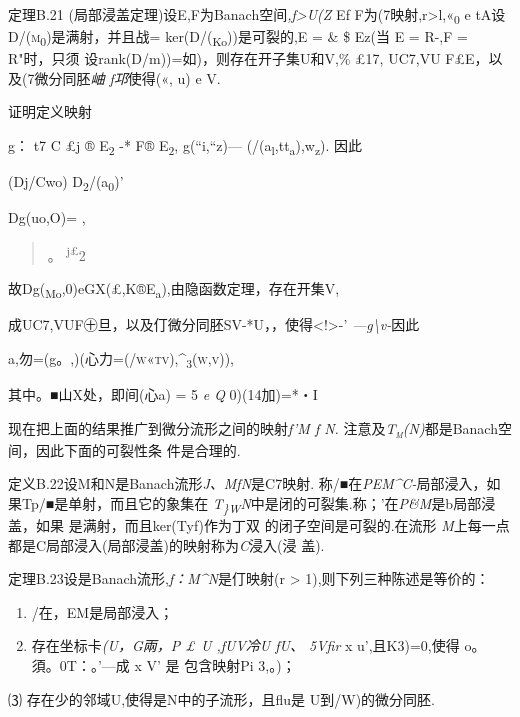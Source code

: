 \documentclass{article}
\begin{document}
定理B.21 (局部浸盖定理)设E,F为Banach空间\emph{,f\textgreater{}U(Z} Ef
F为(7映射,r\textgreater{}l,«\textsubscript{0} e
tA设\textsc{D/(m\textsubscript{0})}是满射，并且战=
ker(D/(\textsubscript{Ko}))是可裂的,E = \& \$ Ez(当 E = R-,F =
R"时，只须 设rank(D/m))=如)，则存在开子集U和V,\% £17, UC7,VU
F£E，以及(7微分同胚\emph{岫 f邛}使得(«, u) e V.

证明定义映射

g： t7 C £j ® E\textsubscript{2} -* F® E\textsubscript{2}, g(``i,``z)---
(/(a\textsubscript{l},tt\textsubscript{a}),w\textsubscript{z}). 因此

(Dj/Cwo) D\textsubscript{2}/(a\textsubscript{0})'

Dg(uo,O)= ,

\begin{quote}
。 \textsuperscript{j£}2
\end{quote}

故Dg(\textsubscript{Mo},0)eGX(£,K®E\textsubscript{a}),由隐函数定理，存在开集V,

成UC7,VUF㊉旦，以及仃微分同胚SV-*U，，使得\textless{}!\textgreater{}-'
\emph{---g\textbackslash{}v-}因此

a,勿=(g。,)(心力=\textsc{(/w«tv),\^{}\textsubscript{3}(w,v)),}

其中。■山X处，即间(心a) = 5 \emph{e Q} 0)(14加)=*・I

现在把上面的结果推广到微分流形之间的映射\emph{f'M f N.}
注意及\emph{\textsc{T\textsubscript{m}(N)}}都是Banach空间，因此下面的可裂性条
件是合理的.

定义B.22设M和N是Banach流形\emph{J、MfN}是C7映射.
称/■在\emph{PEM\^{}C-}局部浸入，如果Tp/■是单射，而且它的象集在
\emph{T\textsubscript{\}W}N}中是闭的可裂集.称；'在\emph{P\&M}是b局部浸盖，如果
是满射，而且ker(Tyf)作为丁双 的闭子空间是可裂的.在流形
\emph{M}上每一点都是C局部浸入(局部浸盖)的映射称为\emph{C}浸入(浸 盖).

定理B.23设是Banach流形,\emph{f：M\^{}N}是仃映射(r \textgreater{}
1),则下列三种陈述是等价的：

\begin{enumerate}
\def\labelenumi{(\arabic{enumi})}
\item
  /在，EM是局部浸入；
\item
  存在坐标卡\emph{(U，G兩，P £ U ,fUV冷U fU、 5Vfir} x u',且K3)=0,使得
  o。須。0T：。'---成 x V' 是 包含映射Pi 3,。)；
\end{enumerate}

⑶ 存在少的邻域U,使得是N中的子流形，且flu是 U到/W)的微分同胚.
\end{document}
